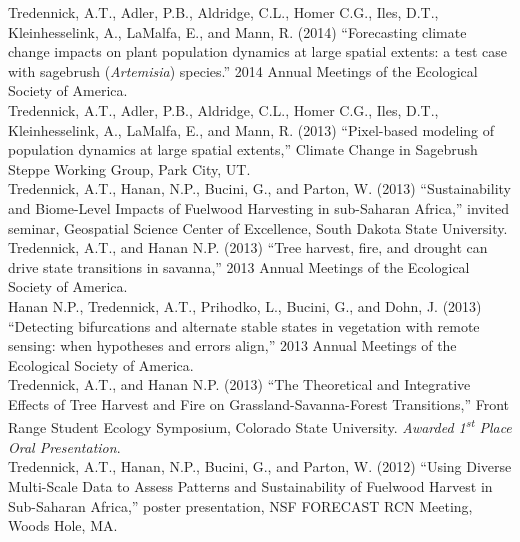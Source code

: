 \documentclass[margin,line]{resume}
\begin{document}
\begin{resume}
    Tredennick, A.T., Adler, P.B., Aldridge, C.L., Homer C.G., Iles, D.T., Kleinhesselink, A., LaMalfa, E., and Mann, R. (2014) ``Forecasting climate change impacts on plant population dynamics at large spatial extents: a test case with sagebrush (\emph{Artemisia}) species.'' 2014 Annual Meetings of the Ecological Society of America.\vspace{-6mm}\\%
    
    Tredennick, A.T., Adler, P.B., Aldridge, C.L., Homer C.G., Iles, D.T., Kleinhesselink, A., LaMalfa, E., and Mann, R. (2013) ``Pixel-based modeling of population dynamics at large spatial extents,'' Climate Change in Sagebrush Steppe Working Group, Park City, UT. \vspace{-6mm}\\%
    
    Tredennick, A.T., Hanan, N.P., Bucini, G., and Parton, W. (2013) ``Sustainability and Biome-Level Impacts of Fuelwood Harvesting in sub-Saharan Africa,'' invited seminar, Geospatial Science Center of Excellence, South Dakota State University. \vspace{-6mm}\\%
    
    Tredennick, A.T., and Hanan N.P. (2013) ``Tree harvest, fire, and drought can drive state transitions in savanna,'' 2013 Annual Meetings of the Ecological Society of America. \vspace{-6mm}\\%
    
    Hanan N.P., Tredennick, A.T., Prihodko, L., Bucini, G., and Dohn, J. (2013) ``Detecting bifurcations and alternate stable states in vegetation with remote sensing: when hypotheses and errors align,'' 2013 Annual Meetings of the Ecological Society of America. \vspace{-6mm}\\%
    
    Tredennick, A.T., and Hanan N.P. (2013) ``The Theoretical and Integrative Effects of Tree Harvest and Fire on Grassland-Savanna-Forest Transitions,'' Front Range Student Ecology Symposium, Colorado State University. \textsl{Awarded 1\textsuperscript{st} Place Oral Presentation}. \vspace{-6mm}\\%
    
    Tredennick, A.T., Hanan, N.P., Bucini, G., and Parton, W. (2012) ``Using Diverse Multi-Scale Data to Assess Patterns and Sustainability of Fuelwood Harvest in Sub-Saharan Africa,'' poster presentation, NSF FORECAST RCN Meeting, Woods Hole, MA. \vspace{-6mm}\\%
    

\end{resume}
\end{document}
